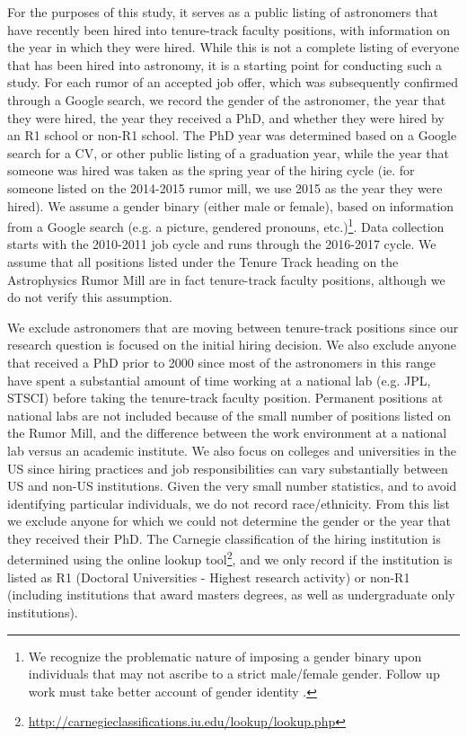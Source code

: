\documentclass[modern]{aastex62}
\begin{document}
For the purposes of this study, it serves as a public listing of astronomers that have recently been hired into tenure-track faculty positions, with information on the year in which they were hired. While this is not a complete listing of everyone that has been hired into astronomy, it is a starting point for conducting such a study. For each rumor of an accepted job offer, which was subsequently confirmed through a Google search, we record the gender of the astronomer, the year that they were hired, the year they received a PhD, and whether they were hired by an R1 school or non-R1 school. The PhD year was determined based on a Google search for a CV, or other public listing of a graduation year, while the year that someone was hired was taken as the spring year of the hiring cycle (ie. for someone listed on the 2014-2015 rumor mill, we use 2015 as the year they were hired). We assume a gender binary (either male or female), based on information from a Google search (e.g. a picture, gendered pronouns, etc.)\footnote{We recognize the problematic nature of imposing a gender binary upon individuals that may not ascribe to a strict male/female gender. Follow up work must take better account of gender identity \citep[e.g.][]{tra16}.}. Data collection starts with the 2010-2011 job cycle and runs through the 2016-2017 cycle. We assume that all positions listed under the Tenure Track heading on the Astrophysics Rumor Mill are in fact tenure-track faculty positions, although we do not verify this assumption. 

We exclude astronomers that are moving between tenure-track positions since our research question is focused on the initial hiring decision. We also exclude anyone that received a PhD prior to 2000 since most of the astronomers in this range have spent a substantial amount of time working at a national lab (e.g. JPL, STSCI) before taking the tenure-track faculty position. Permanent positions at national labs are not included because of the small number of positions listed on the Rumor Mill, and the difference between the work environment at a national lab versus an academic institute. We also focus on colleges and universities in the US since hiring practices and job responsibilities can vary substantially between US and non-US institutions. Given the very small number statistics, and to avoid identifying particular individuals, we do not record race/ethnicity. From this list we exclude anyone for which we could not determine the gender or the year that they received their PhD. The Carnegie classification of the hiring institution is determined using the online lookup tool\footnote{\url{http://carnegieclassifications.iu.edu/lookup/lookup.php}}, and we only record if the institution is listed as R1 (Doctoral Universities - Highest research activity) or non-R1 (including institutions that award masters degrees, as well as undergraduate only institutions). 
\end{document}
